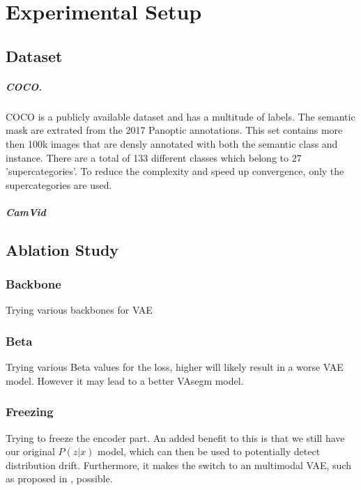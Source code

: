 \chapter{Experimental Setup}\label{chapter:second_real_chapter}

\section{Dataset}
\paragraph{COCO.} COCO \cite{lin2015microsoftcococommonobjects} is a publicly available dataset and has a multitude of labels. The semantic mask are extrated from the 2017 Panoptic annotations. This set contains more then 100k images that are densly annotated with both the semantic class and instance. There are a total of 133 different classes which belong to 27 'supercategories'. To reduce the complexity and speed up convergence, only the supercategories are used.

\paragraph{CamVid}




\section{Ablation Study}

\subsection{Backbone}
Trying various backbones for VAE

\subsection{Beta}
Trying various Beta values for the loss, higher will likely result in a worse VAE model. However it may lead to a better VAsegm model.

\subsection{Freezing}
Trying to freeze the encoder part. An added benefit to this is that we still have our original $P(z | x)$ model, which can then be used to potentially detect distribution drift. Furthermore, it makes the switch to an multimodal VAE, such as proposed in \cite{vasco2020mhvae}, possible.

